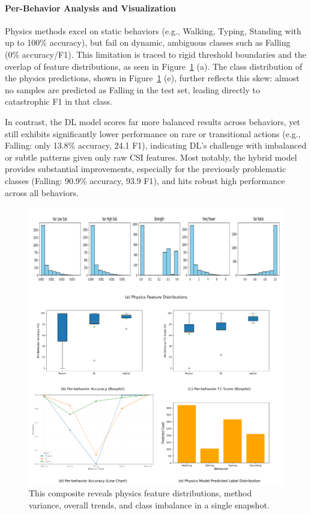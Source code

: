 \documentclass[Afour,sageh,times]{sagej}
\begin{document}
\paragraph{Per-Behavior Analysis and Visualization}

Physics methods excel on static behaviors (e.g., Walking, Typing, Standing with up to 100\% accuracy), but fail on dynamic, ambiguous classes such as Falling (0\% accuracy/F1). This limitation is traced to rigid threshold boundaries and the overlap of feature distributions, as seen in Figure~\ref{fig:exp_results_panel} (a). The class distribution of the physics predictions, shown in Figure~\ref{fig:exp_results_panel} (e), further reflects this skew: almost no samples are predicted as Falling in the test set, leading directly to catastrophic F1 in that class.

In contrast, the DL model scores far more balanced results across behaviors, yet still exhibits significantly lower performance on rare or transitional actions (e.g., Falling: only 13.8\% accuracy, 24.1 F1), indicating DL's challenge with imbalanced or subtle patterns given only raw CSI features. Most notably, the hybrid model provides substantial improvements, especially for the previously problematic classes (Falling: 90.9\% accuracy, 93.9 F1), and hits robust high performance across all behaviors.


\begin{figure}[htbp]
    \centering
    \includegraphics[width=\textwidth]{11.exp_results_panel.png}
    \caption{  This composite reveals physics feature distributions, method variance, overall trends, and class imbalance in a single snapshot.
    }
    \label{fig:exp_results_panel}
\end{figure}
\end{document}
